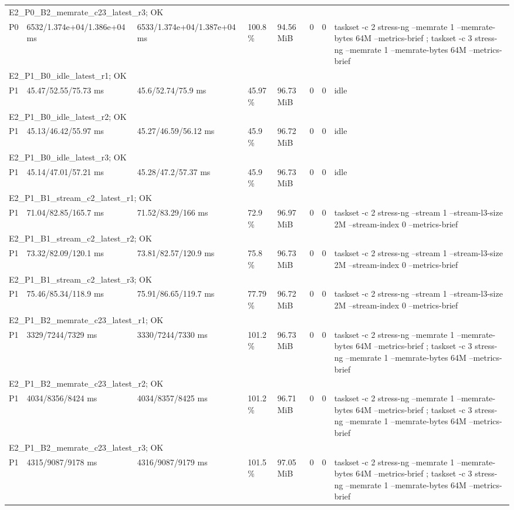 \begin{tabular}{llllllll}
\multicolumn{8}{l}{E2\_P0\_B2\_memrate\_c23\_latest\_r3; OK} \\
P0 & 6532/1.374e+04/1.386e+04 ms & 6533/1.374e+04/1.387e+04 ms & 100.8 \% & 94.56 MiB & 0 & 0 & taskset -c 2 stress-ng --memrate 1 --memrate-bytes 64M --metrics-brief ; taskset -c 3 stress-ng --memrate 1 --memrate-bytes 64M --metrics-brief \\
\multicolumn{8}{l}{E2\_P1\_B0\_idle\_latest\_r1; OK} \\
P1 & 45.47/52.55/75.73 ms & 45.6/52.74/75.9 ms & 45.97 \% & 96.73 MiB & 0 & 0 & idle \\
\multicolumn{8}{l}{E2\_P1\_B0\_idle\_latest\_r2; OK} \\
P1 & 45.13/46.42/55.97 ms & 45.27/46.59/56.12 ms & 45.9 \% & 96.72 MiB & 0 & 0 & idle \\
\multicolumn{8}{l}{E2\_P1\_B0\_idle\_latest\_r3; OK} \\
P1 & 45.14/47.01/57.21 ms & 45.28/47.2/57.37 ms & 45.9 \% & 96.73 MiB & 0 & 0 & idle \\
\multicolumn{8}{l}{E2\_P1\_B1\_stream\_c2\_latest\_r1; OK} \\
P1 & 71.04/82.85/165.7 ms & 71.52/83.29/166 ms & 72.9 \% & 96.97 MiB & 0 & 0 & taskset -c 2 stress-ng --stream 1 --stream-l3-size 2M --stream-index 0 --metrics-brief \\
\multicolumn{8}{l}{E2\_P1\_B1\_stream\_c2\_latest\_r2; OK} \\
P1 & 73.32/82.09/120.1 ms & 73.81/82.57/120.9 ms & 75.8 \% & 96.73 MiB & 0 & 0 & taskset -c 2 stress-ng --stream 1 --stream-l3-size 2M --stream-index 0 --metrics-brief \\
\multicolumn{8}{l}{E2\_P1\_B1\_stream\_c2\_latest\_r3; OK} \\
P1 & 75.46/85.34/118.9 ms & 75.91/86.65/119.7 ms & 77.79 \% & 96.72 MiB & 0 & 0 & taskset -c 2 stress-ng --stream 1 --stream-l3-size 2M --stream-index 0 --metrics-brief \\
\multicolumn{8}{l}{E2\_P1\_B2\_memrate\_c23\_latest\_r1; OK} \\
P1 & 3329/7244/7329 ms & 3330/7244/7330 ms & 101.2 \% & 96.73 MiB & 0 & 0 & taskset -c 2 stress-ng --memrate 1 --memrate-bytes 64M --metrics-brief ; taskset -c 3 stress-ng --memrate 1 --memrate-bytes 64M --metrics-brief \\
\multicolumn{8}{l}{E2\_P1\_B2\_memrate\_c23\_latest\_r2; OK} \\
P1 & 4034/8356/8424 ms & 4034/8357/8425 ms & 101.2 \% & 96.71 MiB & 0 & 0 & taskset -c 2 stress-ng --memrate 1 --memrate-bytes 64M --metrics-brief ; taskset -c 3 stress-ng --memrate 1 --memrate-bytes 64M --metrics-brief \\
\multicolumn{8}{l}{E2\_P1\_B2\_memrate\_c23\_latest\_r3; OK} \\
P1 & 4315/9087/9178 ms & 4316/9087/9179 ms & 101.5 \% & 97.05 MiB & 0 & 0 & taskset -c 2 stress-ng --memrate 1 --memrate-bytes 64M --metrics-brief ; taskset -c 3 stress-ng --memrate 1 --memrate-bytes 64M --metrics-brief \\
\bottomrule
\end{tabular}
